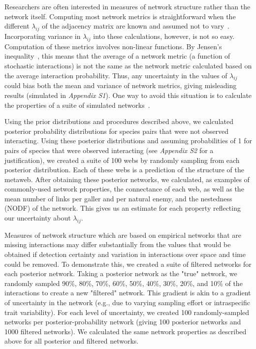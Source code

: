 \documentclass[12pt]{article}
\begin{document}
      Researchers are often interested in measures of network structure rather than the network itself. Computing most network metrics is straightforward when the different $\lambda_{ij}$ of the adjacency matrix are known and assumed not to vary~\citep{Poisot2016}. Incorporating variance in $\lambda_{ij}$ into these calculations, however, is not so easy. Computation of these metrics involves non-linear functions. By Jensen's inequality~\citep{Jensen1906}, this means that the average of a network metric (a function of stochastic interactions) is not the same as the network metric calculated based on the average interaction probability. Thus, any uncertainty in the values of $\lambda_{ij}$ could bias both the mean and variance of network metrics, giving misleading results (simulated in \emph{Appendix S1}). One way to avoid this situation is to calculate the properties of a suite of simulated networks~\citep{Vazquez2005,Guimera2009}.


      Using the prior distributions and procedures described above, we calculated posterior probability distributions for species pairs that were not observed interacting. Using these posterior distributions and assuming probabilities of 1 for pairs of species that were observed interacting (see \emph{Appendix S2} for a justification), we created a suite of 100 webs by randomly sampling from each posterior distribution. Each of these webs is a prediction of the structure of the metaweb. After obtaining these posterior networks, we calculated, as examples of commonly-used network properties, the connectance of each web, as well as the mean number of links per galler and per natural enemy, and the nestedness (NODF) of the network. This gives us an estimate for each property reflecting our uncertainty about $\lambda_{ij}$.


      Measures of network structure which are based on empirical networks that are missing interactions may differ substantially from the values that would be obtained if detection certainty and variation in interactions over space and time could be removed. To demonstrate this, we created a suite of filtered networks for each posterior network. Taking a posterior network as the "true" network, we randomly sampled 90\%, 80\%, 70\%, 60\%, 50\%, 40\%, 30\%, 20\%, and 10\% of the interactions to create a new "filtered" network. This gradient is akin to a gradient of uncertainty in the network (e.g., due to varying sampling effort or intraspecific trait variability). For each level of uncertainty, we created 100 randomly-sampled networks per posterior-probability network (giving 100 posterior networks and 1000 filtered networks). We calculated the same network properties as described above for all posterior and filtered networks.
\end{document}
